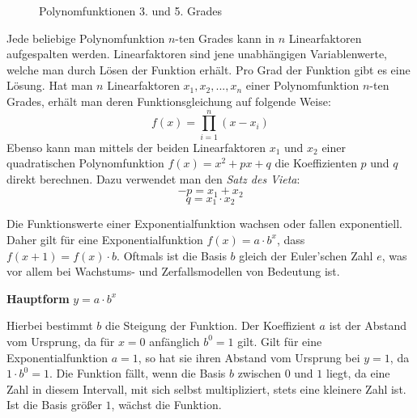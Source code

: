 \pagebreak

\begin{figure}[t!]
\centering
\caption*{Polynomfunktionen 3. und 5. Grades}
\end{figure}


Jede beliebige Polynomfunktion $n$-ten Grades kann in $n$ Linearfaktoren aufgespalten werden. Linearfaktoren sind jene unabh\"{a}ngigen Variablenwerte, welche man durch L\"{o}sen der Funktion erh\"{a}lt. Pro Grad der Funktion gibt es eine L\"{o}sung. Hat man $n$ Linearfaktoren $x_{1}, x_{2}, ..., x_{n}$ einer Polynomfunktion $n$-ten Grades, erh\"{a}lt man deren Funktionsgleichung auf folgende Weise: $$f(x) = \prod_{i = 1}^{n} (x - x_{i})$$ Ebenso kann man mittels der beiden Linearfaktoren $x_{1}$ und $x_{2}$ einer quadratischen Polynomfunktion $f(x) = x^2 + px + q$ die Koeffizienten $p$ und $q$ direkt berechnen. Dazu verwendet man den \emph{Satz des Vieta}: $$-p = x_{1} + x_{2}$$ $$q = x_{1} \cdot x_{2}$$


Die Funktionswerte einer Exponentialfunktion wachsen oder fallen exponentiell. Daher gilt f\"{u}r eine Exponentialfunktion $f(x) = a \cdot b^x$, dass $f(x + 1) = f(x) \cdot b$. Oftmals ist die Basis $b$ gleich der Euler'schen Zahl $e$, was vor allem bei Wachstums- und Zerfallsmodellen von Bedeutung ist.

\textbf{Hauptform}  $y = a \cdot b^x$

Hierbei bestimmt $b$ die Steigung der Funktion. Der Koeffizient $a$ ist der Abstand vom Ursprung, da f\"{u}r $x = 0$ anf\"{a}nglich $b^0 = 1$ gilt. Gilt f\"{u}r eine Exponentialfunktion $a = 1$, so hat sie ihren Abstand vom Ursprung bei $y =1$, da $1 \cdot b^0 = 1$. Die Funktion f\"{a}llt, wenn die Basis $b$ zwischen $0$ und $1$ liegt, da eine Zahl in diesem Intervall, mit sich selbst multipliziert, stets eine kleinere Zahl ist. Ist die Basis gr\"{o}\ss{}er $1$, w\"{a}chst die Funktion.

